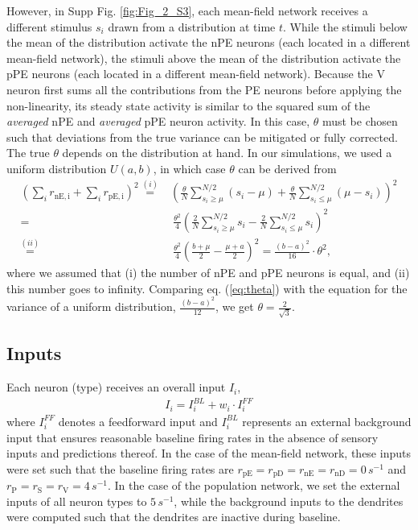 \documentclass[10pt,a4paper]{article}
\begin{document}
However, in Supp Fig. \ref{fig:Fig_2_S3}, each mean-field network receives a different stimulus $s_i$ drawn from a distribution at time $t$. While the stimuli below the mean of the distribution activate the nPE neurons (each located in a different mean-field network), the stimuli above the mean of the distribution activate the pPE neurons (each located in a different mean-field network). Because the V neuron first sums all the contributions from the PE neurons before applying the non-linearity, its steady state activity is similar to the squared sum of the \textit{averaged} nPE and \textit{averaged} pPE neuron activity. In this case, $\theta$ must be chosen such that deviations from the true variance can be mitigated or fully corrected. The true $\theta$ depends on the distribution at hand. In our simulations, we used a uniform distribution $U(a,b)$, in which case $\theta$ can be derived from
%
\begin{align}
\left( \sum_{i} r_\mathrm{nE,i} + \sum_{i} r_\mathrm{pE,i}\right)^2 \overset{(i)}{=} & \left( \frac{\theta}{N}  \sum_{s_i \geq \mu}^{N/2} (s_i - \mu) + \frac{\theta}{N}  \sum_{s_i \leq \mu}^{N/2} (\mu - s_i )\right)^2 \nonumber \\
%
=&\ \frac{\theta^2}{4} \left( \frac{2}{N} \sum_{s_i \geq \mu}^{N/2} s_i - \frac{2}{N} \sum_{s_i \leq \mu}^{N/2} s_i\right)^2\nonumber\\
%
\overset{(ii)}{=}&\ \frac{\theta^2}{4} \left( \frac{b+\mu}{2} - \frac{\mu + a}{2} \right)^2 = \frac{(b-a)^2}{16} \cdot \theta^2,
\label{eq:theta}
\end{align}
%
where we assumed that (i) the number of nPE and pPE neurons is equal, and (ii) this number goes to infinity. Comparing eq. (\ref{eq:theta}) with the equation for the variance of a uniform distribution, $\frac{(b-a)^2}{12}$, we get $\theta = \frac{2}{\sqrt{3}}$.

\subsection{Inputs}
%
Each neuron (type) receives an overall input $I_i$,
%
\begin{align*}
I_i = I_i^{BL} + w_i \cdot I_{i}^{FF}
\end{align*}
%
where $I_{i}^{FF}$ denotes a feedforward input and $I_i^{BL}$ represents an external background input that ensures reasonable baseline firing rates in the absence of sensory inputs and predictions thereof. In the case of the mean-field network, these inputs were set such that the baseline firing rates are $r_\mathrm{pE}=r_\mathrm{pD}=r_\mathrm{nE}=r_\mathrm{nD}=0\, s^{-1}$ and $r_\mathrm{P} = r_\mathrm{S}=r_\mathrm{V}=4\, s^{-1}$. In the case of the population network, we set the external inputs of all neuron types to $5\, s^{-1}$, while the background inputs to the dendrites were computed such that the dendrites are inactive during baseline.
\end{document}
